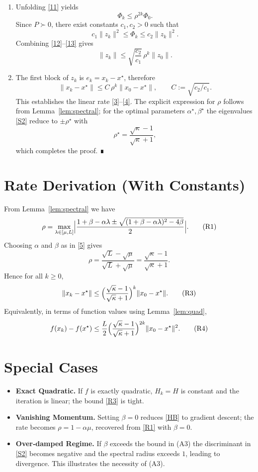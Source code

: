 \documentclass{article}
\begin{document}
\begin{enumerate}
\item[Step 9.]  Unfolding \eqref{11} yields
\[
\Phi_{k}\le\rho^{2k}\Phi_{0}.
\tag{12}
\]
Since $P\succ0$, there exist constants $c_{1},c_{2}>0$ such that
\[
c_{1}\|z_{k}\|^{2}\le\Phi_{k}\le c_{2}\|z_{k}\|^{2}.
\tag{13}
\]
Combining \eqref{12}–\eqref{13} gives
\[
\|z_{k}\|\le\sqrt{\frac{c_{2}}{c_{1}}}\,\rho^{k}\|z_{0}\|.
\tag{14}
\]

\item[Step 10.]  The first block of $z_{k}$ is $e_{k}=x_{k}-x^{\star}$, therefore
\[
\|x_{k}-x^{\star}\|\le C\,\rho^{k}\|x_{0}-x^{\star}\|,\qquad C:=\sqrt{c_{2}/c_{1}}.
\tag{15}
\]
This establishes the linear rate \eqref{3}–\eqref{4}.  The explicit expression for $\rho$ follows from Lemma~\ref{lem:spectral}; for the optimal parameters $\alpha^{\star},\beta^{\star}$ the eigenvalues \eqref{S2} reduce to $\pm\rho^{\star}$ with
\[
\rho^{\star}= \frac{\sqrt{\kappa}-1}{\sqrt{\kappa}+1},
\tag{16}
\]
which completes the proof. ∎
\end{enumerate}

\section*{Rate Derivation (With Constants)}
From Lemma~\ref{lem:spectral} we have
\[
\rho = \max_{\lambda\in[\mu,L]}\Bigl|\frac{1+\beta-\alpha\lambda\pm\sqrt{(1+\beta-\alpha\lambda)^{2}-4\beta}}{2}\Bigr|.
\tag{R1}
\]
Choosing $\alpha$ and $\beta$ as in \eqref{5} gives
\[
\rho = \frac{\sqrt{L}-\sqrt{\mu}}{\sqrt{L}+\sqrt{\mu}} = \frac{\sqrt{\kappa}-1}{\sqrt{\kappa}+1}.
\tag{R2}
\]
Hence for all $k\ge0$,
\[
\|x_{k}-x^{\star}\|\le\Bigl(\frac{\sqrt{\kappa}-1}{\sqrt{\kappa}+1}\Bigr)^{k}\|x_{0}-x^{\star}\|.
\tag{R3}
\]
Equivalently, in terms of function values using Lemma~\ref{lem:quad},
\[
f(x_{k})-f(x^{\star})\le \frac{L}{2}\Bigl(\frac{\sqrt{\kappa}-1}{\sqrt{\kappa}+1}\Bigr)^{2k}\|x_{0}-x^{\star}\|^{2}.
\tag{R4}
\]

\section*{Special Cases}
\begin{itemize}[leftmargin=*]
\item \textbf{Exact Quadratic.} If $f$ is exactly quadratic, $H_{k}=H$ is constant and the iteration is linear; the bound \eqref{R3} is tight.
\item \textbf{Vanishing Momentum.} Setting $\beta=0$ reduces \eqref{HB} to gradient descent; the rate becomes $\rho=1-\alpha\mu$, recovered from \eqref{R1} with $\beta=0$.
\item \textbf{Over‑damped Regime.} If $\beta$ exceeds the bound in (A3) the discriminant in \eqref{S2} becomes negative and the spectral radius exceeds $1$, leading to divergence.  This illustrates the necessity of (A3).
\end{itemize}
\end{document}
